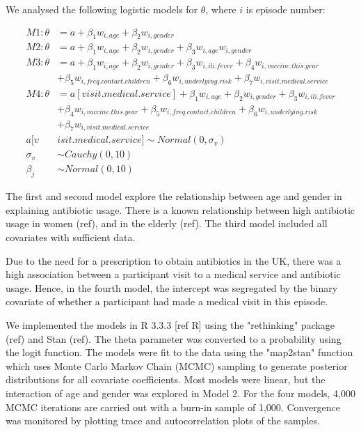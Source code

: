 \documentclass{article}
\begin{document}
We analysed the following logistic models for $\theta$, where $i$ is episode number:

\begin{align}
M1: \theta &= a + \beta_1 w_{i,age} + \beta_2 w_{i,gender} \\
M2: \theta &= a + \beta_1 w_{i,age} + \beta_2 w_{i,gender} + \beta_3 w_{i,age}w_{i,gender} \\
M3: \theta &= a + \beta_1 w_{i,age} + \beta_2 w_{i,gender} + \beta_3 w_{i,ili.fever} + \beta_4 w_{i,vaccine.this.year} 
\\ & + \beta_5 w_{i,freq.contact.children} + \beta_6 w_{i,underlying.risk} + \beta_7 w_{i,visit.medical.service} \\
M4: \theta &= a[visit.medical.service]  + \beta_1 w_{i,age} + \beta_2 w_{i,gender} + \beta_3 w_{i,ili.fever} 
\\ & + \beta_4 w_{i,vaccine.this.year} + \beta_5 w_{i,freq.contact.children} + \beta_6 w_{i,underlying.risk}
\\ & + \beta_7 w_{i,visit.medical.service} 
\\ a[v&isit.medical.service] \sim Normal(0,\sigma_v)
\\ \sigma_v &\sim Cauchy(0,10)
\\ \beta_{j} &\sim Normal(0,10)
\end{align}

The first and second model explore the relationship between age and gender in explaining antibiotic usage. There is a known relationship between high antibiotic usage in women (ref), and in the elderly (ref). The third model included all covariates with sufficient data.

Due to the need for a prescription to obtain antibiotics in the UK, there was a high association between a participant visit to a medical service and antibiotic usage. Hence, in the fourth model, the intercept was segregated by the binary covariate of whether a participant had made a medical visit in this episode. 

We implemented the models in R 3.3.3 [ref R] using the "rethinking" package (ref) and Stan (ref). The theta parameter was converted to a probability using the logit function. The models were fit to the data using the "map2stan" function which uses Monte Carlo Markov Chain (MCMC) sampling to generate posterior distributions for all covariate coefficients. Most models were linear, but the interaction of age and gender was explored in Model 2. For the four models, 4,000 MCMC iterations are carried out with a burn-in sample of 1,000. Convergence was monitored by plotting trace and autocorrelation plots of the samples. 
\end{document}
